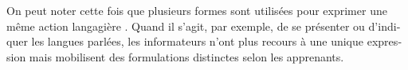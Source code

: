 \documentclass[output=paper]{langscibook}
\begin{document}
\begin{otherlanguage}{french}


On peut noter cette fois que plusieurs formes sont utilisées pour exprimer une même action langagière . Quand il s’agit, par exemple, de se présenter ou d’indiquer les langues parlées, les informateurs n’ont plus recours à une unique expression mais mobilisent des formulations distinctes selon les apprenants. 


\end{otherlanguage}
\end{document}
